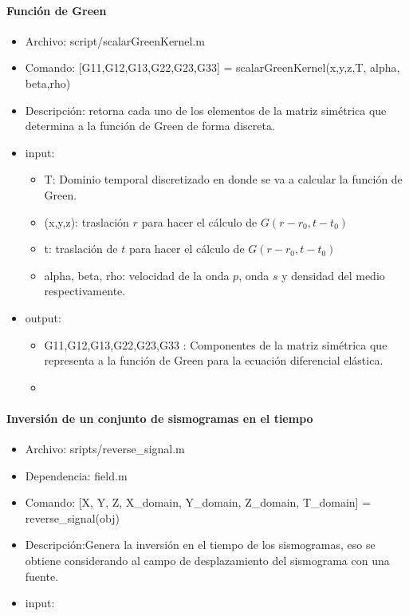 \paragraph{Función de Green}
\begin{itemize}
  \item Archivo: script/scalarGreenKernel.m
  \item Comando: [G11,G12,G13,G22,G23,G33] = scalarGreenKernel(x,y,z,T, alpha,
  beta,rho)
  \item Descripción: retorna cada uno de los elementos de la matriz simétrica
  que determina a la función de Green de forma discreta.
  \item input:
  \begin{itemize}
    \item T: Dominio temporal discretizado en donde se va a calcular la función
    de Green.
    \item (x,y,z): traslación $r$ para hacer el cálculo de $G(r-r_0,t-t_0)$
    \item t: traslación de $t$ para hacer el cálculo de $G(r-r_0,t-t_0)$
    \item alpha, beta, rho: velocidad de la onda $p$, onda $s$ y densidad del 
    medio respectivamente.
  \end{itemize}
  \item output:
  \begin{itemize}
    \item G11,G12,G13,G22,G23,G33 : Componentes de la matriz simétrica que
    representa a la función de Green para la ecuación diferencial elástica.
    \item 
  \end{itemize}
\end{itemize}

\paragraph{Inversión de un conjunto de sismogramas en el tiempo}
\begin{itemize}
	\item Archivo: sripts/reverse\_signal.m
	\item Dependencia: field.m
	\item Comando: [X, Y, Z, X\_domain, Y\_domain, Z\_domain, T\_domain] =
	reverse\_signal(obj)
	\item Descripción:Genera la inversión en el tiempo de los sismogramas, eso   
	se obtiene considerando al campo de desplazamiento del sismograma con una 
	fuente.
	\item input:
\end{itemize}

